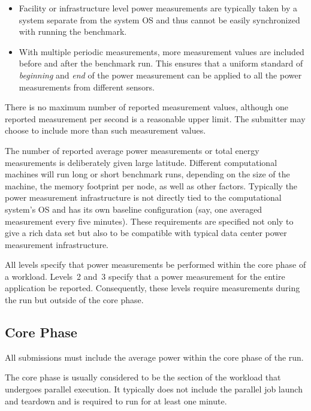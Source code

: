 \begin{itemize}
\item
Facility or infrastructure level power measurements are typically taken by a system separate from the system OS and thus cannot be easily synchronized with running the benchmark.
\item
With multiple periodic measurements, more measurement values are included before and after the benchmark run.
This ensures that a uniform standard of \textit{beginning} and \textit{end} of the power measurement can be applied to all the power measurements from different sensors.
\end{itemize}

\noindent
There is no maximum number of reported measurement values, although one reported measurement per second is a reasonable upper limit.
The submitter may choose to include more than \MinMeasurementsCorePhaseLTwoThree{} such measurement values.
\wl

\noindent
The number of reported average power measurements or total energy measurements is deliberately given large latitude.
Different computational machines will run long or short benchmark runs, depending on the size of the machine, the memory footprint per node, as well as other factors.
Typically the power measurement infrastructure is not directly tied to the computational system's OS and has its own baseline configuration (say, one averaged measurement every five minutes).
These requirements are specified not only to give a rich data set but also to be compatible with typical data center power measurement infrastructure.
\wl

\noindent
All levels specify that power measurements be performed within the core phase of a workload.
Levels~2 and~3 specify that a power measurement for the entire application be reported.
Consequently, these levels require measurements during the run but outside of the core phase.

\subsection{Core Phase}
\label{sec:core_phase}
\noindent
All submissions must include the average power within the core phase of the run.
\wl

\noindent
The core phase is usually considered to be the section of the workload that undergoes parallel execution.
It typically does not include the parallel job launch and teardown and is required to run for at least one minute.
\wl

